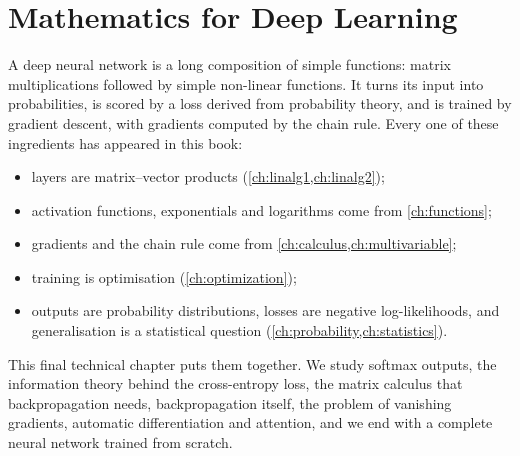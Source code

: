 \chapter{Mathematics for Deep Learning}\label{ch:dl}

\begin{motivation}
A deep neural network is a long composition of simple functions: matrix
multiplications followed by simple non-linear functions. It turns its input
into probabilities, is scored by a loss derived from probability theory, and is
trained by gradient descent, with gradients computed by the chain rule. Every
one of these ingredients has appeared in this book:
\begin{itemize}
  \item layers are matrix--vector products (\cref{ch:linalg1,ch:linalg2});
  \item activation functions, exponentials and logarithms come from
    \cref{ch:functions};
  \item gradients and the chain rule come from \cref{ch:calculus,ch:multivariable};
  \item training is optimisation (\cref{ch:optimization});
  \item outputs are probability distributions, losses are negative
    log-likelihoods, and generalisation is a statistical question
    (\cref{ch:probability,ch:statistics}).
\end{itemize}
This final technical chapter puts them together. We study softmax outputs, the
information theory behind the cross-entropy loss, the matrix calculus that
backpropagation needs, backpropagation itself, the problem of vanishing
gradients, automatic differentiation and attention, and we end with a complete
neural network trained from scratch.
\end{motivation}

